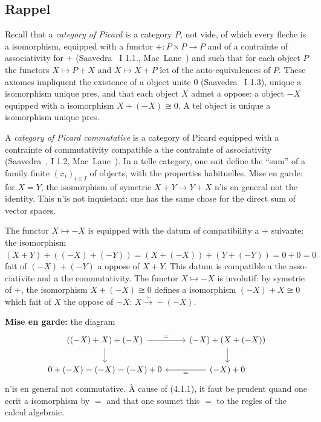 \documentclass[12pt,a4paper]{article}
\theoremstyle{plain}
\theoremstyle{definition}
\begin{document}
\subsection{Rappel}

Recall that a \emph{category of Picard} is a category $P$, not vide, of which
every fleche is a isomorphism, equipped with a functor $+: P \times P \to P$ and of a
contrainte of associativity for $+$ (Saavedra~\cite{15} I 1.1., Mac~Lane~\cite{11}) and
such that for each object $P$ the functors $X \mapsto P + X$ and $X \mapsto X + P$ let
of the auto-equivalences of $P$. These axiomes impliquent the existence of a object unite
$0$ (Saavedra~\cite{15} I 1.3), unique a isomorphism unique pres, and that each object
$X$ admet a oppose: a object $-X$ equipped with a isomorphism $X + (-X) \cong 0$. A
tel object is unique a isomorphism unique pres.

A \emph{category of Picard commutative} is a category of Picard equipped with a
contrainte of commutativity compatible a the contrainte of associativity (Saavedra~\cite{15}, I 1.2, Mac~Lane~\cite{11}). In a telle category, one sait define the ``sum''
of a family finite $(x_i)_{i \in I}$ of objects, with the properties habituelles. Mise
en garde: for $X = Y$, the isomorphism of symetrie $X + Y \to Y + X$ n'is en general
not the identity. This n'is not inquietant: one has the same chose for the direct sum
of vector spaces.

The functor $X \mapsto -X$ is equipped with the datum of compatibility a $+$ suivante:
the isomorphism $(X + Y) + ((-X) + (-Y)) = (X + (-X)) + (Y + (-Y)) = 0 + 0 = 0$
fait of $(-X) + (-Y)$ a oppose of $X + Y$. This datum is compatible a the asso-
ciativite and a the commutativity. The functor $X \mapsto -X$ is involutif: by symetrie
of $+$, the isomorphism $X + (-X) \cong 0$ defines a isomorphism $(-X) + X \cong 0$ which
fait of $X$ the oppose of $-X$: $X \xrightarrow{\sim} -(-X)$.

\textbf{Mise en garde:} the diagram
\begin{equation}\label{eq:4.1.1}
\begin{tikzcd}
((-X) + X) + (-X) \arrow[r, "="] \arrow[d] & (-X) + (X + (-X)) \arrow[d] \\
0 + (-X) = (-X) = (-X) + 0 & (-X) + 0 \arrow[l, "="]
\end{tikzcd}
\end{equation}
n'is en general not commutative. \`A cause of (4.1.1), it faut be prudent quand
one ecrit a isomorphism by $=$ and that one soumet this $=$ to the regles of the calcul algebraic.
\end{document}
